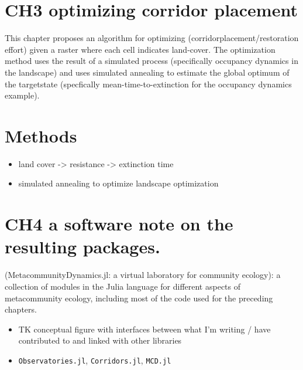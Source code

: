 \documentclass[10pt,oneside]{article}
\begin{document}
\hypertarget{ch3-optimizing-corridor-placement}{%
\section{CH3 optimizing corridor
placement}\label{ch3-optimizing-corridor-placement}}

This chapter proposes an algorithm for optimizing
(corridorplacement/restoration effort) given a raster where each cell
indicates land-cover. The optimization method uses the result of a
simulated process (specifically occupancy dynamics in the landscape) and
uses simulated annealing to estimate the global optimum of the
targetstate (specfically mean-time-to-extinction for the occupancy
dynamics example).

\hypertarget{methods-2}{%
\section{Methods}\label{methods-2}}

\begin{itemize}
\tightlist
\item
  land cover -\textgreater{} resistance -\textgreater{} extinction time
\item
  simulated annealing to optimize landscape optimization
\end{itemize}

\hypertarget{ch4-a-software-note-on-the-resulting-packages.}{%
\section{CH4 a software note on the resulting
packages.}\label{ch4-a-software-note-on-the-resulting-packages.}}

(MetacommunityDynamics.jl: a virtual laboratory for community ecology):
a collection of modules in the Julia language for different aspects of
metacommunity ecology, including most of the code used for the preceding
chapters.

\begin{itemize}
\item
  TK conceptual figure with interfaces between what I'm writing / have
  contributed to and linked with other libraries
\item
  \texttt{Observatories.jl}, \texttt{Corridors.jl}, \texttt{MCD.jl}
\end{itemize}
\end{document}
